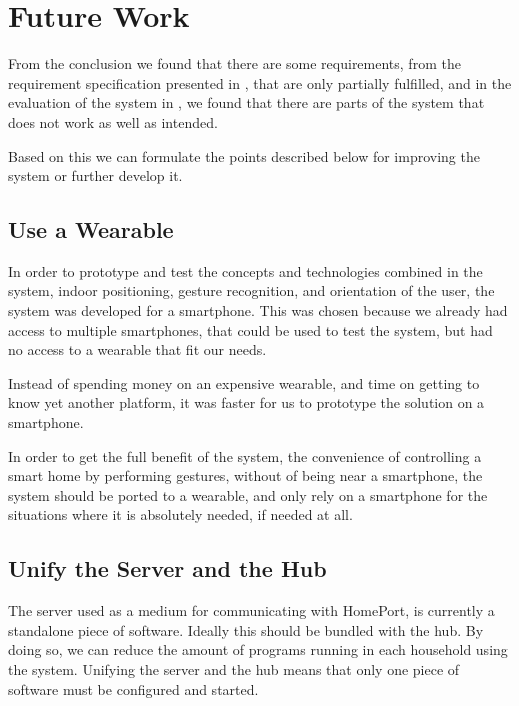 \section{Future Work}\label{sec:conclusion:future-work}

From the conclusion we found that there are some requirements, 
from the requirement specification presented in , 
that are only partially fulfilled, 
and in the evaluation of the system in , 
we found that there are parts of the system that does not work as well as intended.

Based on this we can formulate the points described below for improving the system or further develop it.

\subsection{Use a Wearable}

In order to prototype and test the concepts and technologies combined in the system, 
\eg indoor positioning, gesture recognition, and orientation of the user, 
the system was developed for a smartphone.
This was chosen because we already had access to multiple smartphones, 
that could be used to test the system, 
but had no access to a wearable that fit our needs.

Instead of spending money on an expensive wearable, 
and time on getting to know yet another platform, 
it was faster for us to prototype the solution on a smartphone.

In order to get the full benefit of the system, 
\ie the convenience of controlling a smart home by performing gestures, 
without of being near a smartphone, 
the system should be ported to a wearable, 
and only rely on a smartphone for the situations where it is absolutely needed, if needed at all.

\subsection{Unify the Server and the Hub}

The server used as a medium for communicating with HomePort, 
is currently a standalone piece of software. 
Ideally this should be bundled with the hub. 
By doing so, we can reduce the amount of programs running in each household using the system. 
Unifying the server and the hub means that only one piece of software must be configured and started.

